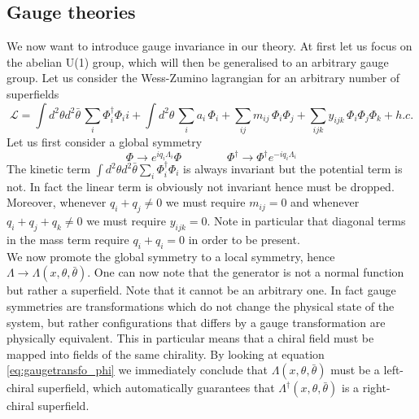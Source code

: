 \documentclass[12pt]{article}
\begin{document}
\subsection*{Gauge theories}
We now want to introduce gauge invariance in our theory. At first let us focus on the abelian U(1) group, which will then be generalised to an arbitrary gauge group. 
Let us consider the Wess-Zumino lagrangian for an arbitrary number of superfields
\begin{equation*}
  \mathcal{L} = \int d^2\theta d^2\bar\theta \, \sum_i \Phi_i^\dagger \Phi_ii + \int d^2\theta \, \sum_i a_i \, \Phi_i + \sum_{ij} m_{ij} \, \Phi_i\Phi_j + \sum_{ijk} y_{ijk} \, \Phi_i\Phi_j\Phi_k + h.c.
\end{equation*}
Let us first consider 
a global symmetry
\begin{equation}
  \Phi \to e^{iq_i \Lambda_i}\Phi \qquad \qquad \Phi^\dagger \to \Phi^\dagger e^{-iq_i \Lambda_i}
  \label{eq:gaugetransf_phi}
\end{equation}
The kinetic term $\int d^2\theta d^2\bar\theta \sum_i \Phi_i^\dagger \Phi_i$ is always invariant but the potential term is not. In fact the linear term is obviously not invariant hence must be dropped. 
Moreover, whenever $q_i + q_j \neq 0$ we must require $m_{ij} = 0$ and whenever $q_i + q_j + q_k \neq 0$ we must require $y_{ijk} = 0$. Note in particular that diagonal terms in the mass term require $q_i + q_i = 0$ in order to be present. \\
We now promote the global symmetry to a local symmetry, hence $\Lambda \to \Lambda(x, \theta, \bar\theta)$. One can now note that the generator is not a normal function but rather a superfield. Note that it cannot be an arbitrary one. 
In fact gauge symmetries are transformations which do not change the physical state of the system, but rather configurations that differs by a gauge transformation are physically equivalent. This in particular means that a chiral field must be mapped into fields of the same chirality. 
By looking at equation \ref{eq:gaugetransfo_phi} we immediately conclude that $\Lambda(x, \theta, \bar\theta)$ must be a left-chiral superfield, which automatically guarantees that $\Lambda^\dagger(x, \theta, \bar\theta)$ is a right-chiral superfield.
\end{document}
